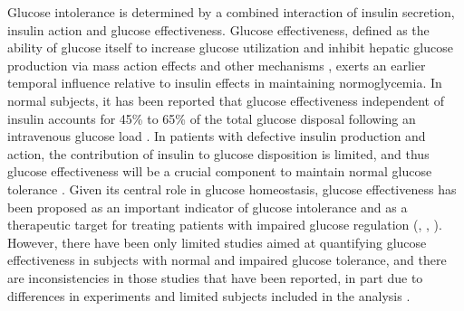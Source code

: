 \documentclass[utf8]{frontiersSCNS} %
\begin{document}
Glucose intolerance is determined by a combined interaction of insulin secretion, insulin action and glucose effectiveness. Glucose effectiveness, defined as the ability of glucose itself to increase glucose utilization and inhibit hepatic glucose production via mass action effects and other mechanisms \citep{Dube2015}, exerts an earlier temporal influence relative to insulin effects in maintaining normoglycemia. In normal subjects, it has been reported that glucose effectiveness independent of insulin accounts for 45\% to 65\% of the total glucose disposal following an intravenous glucose load \citep{Alford_2018}. In patients with defective insulin production and action, the contribution of insulin to glucose disposition is limited, and thus glucose effectiveness will be a crucial component to maintain normal glucose tolerance \citep{Dube2015}. Given its central role in glucose homeostasis, glucose effectiveness has been proposed as an important indicator of glucose intolerance and as a therapeutic target for treating patients with impaired glucose regulation (\citet{basu_2009}, \citet{pau_2014}, \citet{Alford_2018}). However, there have been only limited studies aimed at quantifying glucose effectiveness in subjects with normal and impaired glucose tolerance, and there are inconsistencies in those studies that have been reported, in part due to  differences in experiments and limited subjects included in the analysis \citep{Dube2015}.
\end{document}

